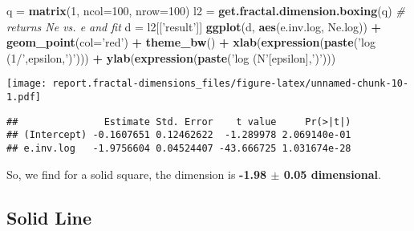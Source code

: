 \documentclass[]{article}
\newenvironment{Shaded}{\begin{snugshade}}{\end{snugshade}}
\newcommand{\CommentTok}[1]{\textcolor[rgb]{0.56,0.35,0.01}{\textit{#1}}}
\newcommand{\DataTypeTok}[1]{\textcolor[rgb]{0.13,0.29,0.53}{#1}}
\newcommand{\DecValTok}[1]{\textcolor[rgb]{0.00,0.00,0.81}{#1}}
\newcommand{\KeywordTok}[1]{\textcolor[rgb]{0.13,0.29,0.53}{\textbf{#1}}}
\newcommand{\NormalTok}[1]{#1}
\newcommand{\OperatorTok}[1]{\textcolor[rgb]{0.81,0.36,0.00}{\textbf{#1}}}
\newcommand{\StringTok}[1]{\textcolor[rgb]{0.31,0.60,0.02}{#1}}
\begin{document}
\begin{Shaded}
\begin{Highlighting}[]
\NormalTok{q =}\StringTok{ }\KeywordTok{matrix}\NormalTok{(}\DecValTok{1}\NormalTok{, }\DataTypeTok{ncol=}\DecValTok{100}\NormalTok{, }\DataTypeTok{nrow=}\DecValTok{100}\NormalTok{)}
\NormalTok{l2 =}\StringTok{ }\KeywordTok{get.fractal.dimension.boxing}\NormalTok{(q)}
\CommentTok{# returns Ne vs. e and fit}
\NormalTok{d =}\StringTok{ }\NormalTok{l2[[}\StringTok{'result'}\NormalTok{]]}
\KeywordTok{ggplot}\NormalTok{(d, }\KeywordTok{aes}\NormalTok{(e.inv.log, Ne.log)) }\OperatorTok{+}\StringTok{ }\KeywordTok{geom_point}\NormalTok{(}\DataTypeTok{col=}\StringTok{'red'}\NormalTok{) }\OperatorTok{+}
\StringTok{  }\KeywordTok{theme_bw}\NormalTok{() }\OperatorTok{+}\StringTok{ }
\StringTok{  }\KeywordTok{xlab}\NormalTok{(}\KeywordTok{expression}\NormalTok{(}\KeywordTok{paste}\NormalTok{(}\StringTok{'log (1/'}\NormalTok{,epsilon,}\StringTok{')'}\NormalTok{))) }\OperatorTok{+}
\StringTok{  }\KeywordTok{ylab}\NormalTok{(}\KeywordTok{expression}\NormalTok{(}\KeywordTok{paste}\NormalTok{(}\StringTok{'log (N'}\NormalTok{[epsilon],}\StringTok{')'}\NormalTok{)))}
\end{Highlighting}
\end{Shaded}

\texttt{[image: report.fractal-dimensions\_files/figure-latex/unnamed-chunk-10-1.pdf]}

\begin{Shaded}
\end{Shaded}

\begin{verbatim}
##               Estimate Std. Error    t value     Pr(>|t|)
## (Intercept) -0.1607651 0.12462622  -1.289978 2.069140e-01
## e.inv.log   -1.9756604 0.04524407 -43.666725 1.031674e-28
\end{verbatim}

So, we find for a solid square, the dimension is \textbf{-1.98 \(\pm\)
0.05 dimensional}.

\hypertarget{solid-line}{%
\subsection{Solid Line}\label{solid-line}}
\end{document}

